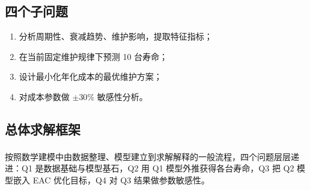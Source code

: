 \documentclass[12pt, a4paper, fontset=fandol]{ctexart}
\let\oldcite\cite
\renewcommand{\cite}[1]{\textsuperscript{\oldcite{#1}}}
\theoremstyle{definition}
\begin{document}
\subsection{四个子问题}
\begin{enumerate}[leftmargin=2em]
  \item[Q1] 分析周期性、衰减趋势、维护影响，提取特征指标；
  \item[Q2] 在当前固定维护规律下预测 10 台寿命；
  \item[Q3] 设计最小化年化成本的最优维护方案；
  \item[Q4] 对成本参数做 $\pm 30\%$ 敏感性分析。
\end{enumerate}

\subsection{总体求解框架}
按照数学建模中由数据整理、模型建立到求解解释的一般流程\cite{mathmodel_cn}，四个问题层层递进：Q1 是数据基础与模型基石，Q2 用 Q1 模型外推获得各台寿命，Q3 把 Q2 模型嵌入 EAC 优化目标，Q4 对 Q3 结果做参数敏感性。
\end{document}
